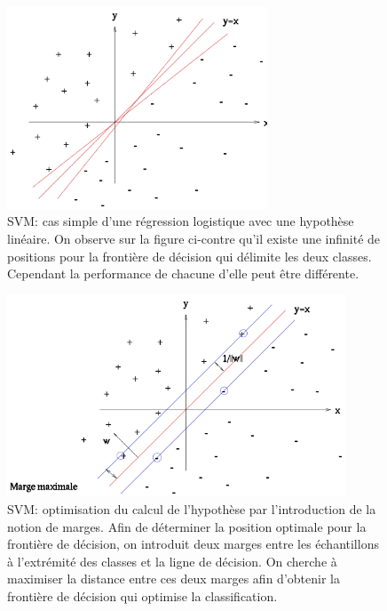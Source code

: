 \begin{figure}[h]
	\centering\includegraphics[height=6cm]{images/svm_no_margin.png}
	\caption[SVM: cas simple d'une régression logistique avec une hypothèse linéaire]{SVM: cas simple d'une régression logistique avec une hypothèse linéaire. On observe sur la figure ci-contre qu'il existe une infinité de positions pour la frontière de décision qui délimite les deux classes. Cependant la performance de chacune d'elle peut être différente.}
	\label{fig:SVM: cas simple d'une regression logistique avec une hypothèse linéaire}
\end{figure}

\begin{figure}[h]
	\centering\includegraphics[height=6cm]{images/svm_margin.png}
	\caption[SVM: optimisation du calcul de l'hypothèse par l'introduction de marges]{SVM: optimisation du calcul de l'hypothèse par l'introduction de la notion de marges. Afin de déterminer la position optimale pour la frontière de décision, on introduit deux marges entre les échantillons à l'extrémité des classes et la ligne de décision. On cherche à maximiser la distance entre ces deux marges afin d'obtenir la frontière de décision qui optimise la classification.}
	\label{fig:SVM: optimisation du calcul de l'hypothèse par l'introduction de marges}
\end{figure}

